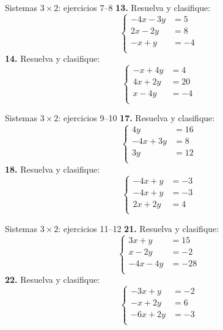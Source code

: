 \documentclass[aspectratio=169,9pt]{beamer}
\theoremstyle{remark}
\begin{document}
\begin{frame}{Sistemas $3\times 2$: ejercicios 7--8}
\small
\textbf{13.} Resuelva y clasifique:
\[\left\{\begin{aligned}
-4x-3y&=5\\
2x-2y&=8\\
-x+y&=-4\\
\end{aligned}\right.\]
\textbf{14.} Resuelva y clasifique:
\[\left\{\begin{aligned}
-x+4y&=4\\
4x+2y&=20\\
x-4y&=-4\\
\end{aligned}\right.\]
\end{frame}
\begin{frame}{Sistemas $3\times 2$: ejercicios 9--10}
\small
\textbf{17.} Resuelva y clasifique:
\[\left\{\begin{aligned}
4y&=16\\
-4x+3y&=8\\
3y&=12\\
\end{aligned}\right.\]
\textbf{18.} Resuelva y clasifique:
\[\left\{\begin{aligned}
-4x+y&=-3\\
-4x+y&=-3\\
2x+2y&=4\\
\end{aligned}\right.\]
\end{frame}
\begin{frame}{Sistemas $3\times 2$: ejercicios 11--12}
\small
\textbf{21.} Resuelva y clasifique:
\[\left\{\begin{aligned}
3x+y&=15\\
x-2y&=-2\\
-4x-4y&=-28\\
\end{aligned}\right.\]
\textbf{22.} Resuelva y clasifique:
\[\left\{\begin{aligned}
-3x+y&=-2\\
-x+2y&=6\\
-6x+2y&=-3\\
\end{aligned}\right.\]
\end{frame}
\end{document}
